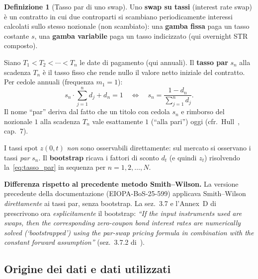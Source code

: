 \documentclass[11pt,a4paper]{article}
\theoremstyle{plain}
\theoremstyle{definition}
\newtheorem{definizione}[teorema]{Definizione}
\theoremstyle{remark}
\newcommand{\estr}{\texteuro{}STR}
\begin{document}
\begin{definizione}[Tasso par di uno swap]
\label{def:tasso_par}
Uno \textbf{swap su tassi} (interest rate swap) \`e un contratto in cui due controparti
si scambiano periodicamente interessi calcolati sullo stesso nozionale (non scambiato):
una \textbf{gamba fissa} paga un tasso costante $s$, una \textbf{gamba variabile} paga
un tasso indicizzato (qui overnight \estr{} composto).

Siano $T_1 < T_2 < \cdots < T_n$ le date di pagamento (qui annuali). Il \textbf{tasso
par} $s_n$ alla scadenza $T_n$ \`e il tasso fisso che rende nullo il valore netto
iniziale del contratto. Per cedole annuali (frequenza $m_1=1$):
\begin{equation}
  \label{eq:tasso_par}
  s_n \cdot \sum_{j=1}^{n} d_j + d_n = 1
  \quad\Longleftrightarrow\quad
  s_n = \frac{1 - d_n}{\displaystyle\sum_{j=1}^{n} d_j}.
\end{equation}
Il nome ``par'' deriva dal fatto che un titolo con cedola $s_n$ e rimborso del nozionale
$1$ alla scadenza $T_n$ vale esattamente $1$ (``alla pari'') oggi (cfr.\ Hull~\cite{hull2018},
cap.~7).
\end{definizione}

\begin{keybox}
I tassi spot $z(0,t)$ \emph{non} sono osservabili direttamente: sul mercato si
osservano i tassi \emph{par} $s_n$. Il \textbf{bootstrap} ricava i fattori di sconto
$d_t$ (e quindi $z_t$) risolvendo la~\eqref{eq:tasso_par} in sequenza per
$n=1,2,\ldots,N$.

\smallskip
\textbf{Differenza rispetto al precedente metodo Smith--Wilson.} La versione precedente
della documentazione (EIOPA-BoS-25-599) applicava Smith--Wilson \emph{direttamente} ai
tassi par, senza bootstrap. La sez.~3.7 e l'Annex~D di~\cite{eiopa2026} prescrivono ora
\emph{esplicitamente} il bootstrap: \emph{``If the input instruments used are swaps,
then the corresponding zero-coupon bond interest rates are numerically solved
(`bootstrapped') using the par-swap pricing formula in combination with the constant
forward assumption''} (sez.~3.7.2 di~\cite{eiopa2026}).
\end{keybox}

\subsection{Origine dei dati e dati utilizzati}
\label{sec:dati-origine}
\end{document}
